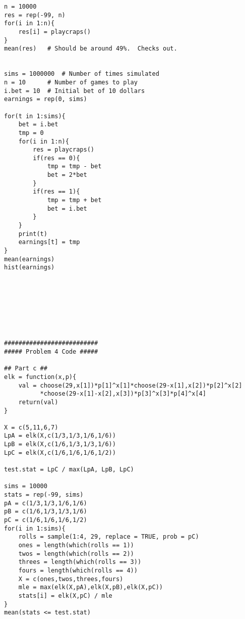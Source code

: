 \documentclass[11pt]{article}
\begin{document}
\begin{center}
\begin{lstlisting}
n = 10000
res = rep(-99, n)
for(i in 1:n){
	res[i] = playcraps()
}
mean(res)	# Should be around 49%.  Checks out.


sims = 1000000	# Number of times simulated
n = 10		# Number of games to play
i.bet = 10	# Initial bet of 10 dollars
earnings = rep(0, sims)

for(t in 1:sims){
	bet = i.bet
	tmp = 0
	for(i in 1:n){
		res = playcraps()
		if(res == 0){
			tmp = tmp - bet
			bet = 2*bet
		}
		if(res == 1){
			tmp = tmp + bet
			bet = i.bet
		}
	}
	print(t)
	earnings[t] = tmp
}
mean(earnings)
hist(earnings)








##########################
##### Problem 4 Code #####

## Part c ##
elk = function(x,p){
	val = choose(29,x[1])*p[1]^x[1]*choose(29-x[1],x[2])*p[2]^x[2]
	      *choose(29-x[1]-x[2],x[3])*p[3]^x[3]*p[4]^x[4]
	return(val)
}

X = c(5,11,6,7)
LpA = elk(X,c(1/3,1/3,1/6,1/6))
LpB = elk(X,c(1/6,1/3,1/3,1/6))
LpC = elk(X,c(1/6,1/6,1/6,1/2))

test.stat = LpC / max(LpA, LpB, LpC)

sims = 10000
stats = rep(-99, sims)
pA = c(1/3,1/3,1/6,1/6)
pB = c(1/6,1/3,1/3,1/6)
pC = c(1/6,1/6,1/6,1/2)
for(i in 1:sims){
	rolls = sample(1:4, 29, replace = TRUE, prob = pC)
	ones = length(which(rolls == 1))
	twos = length(which(rolls == 2))
	threes = length(which(rolls == 3))
	fours = length(which(rolls == 4))
	X = c(ones,twos,threes,fours)
	mle = max(elk(X,pA),elk(X,pB),elk(X,pC))
	stats[i] = elk(X,pC) / mle
}
mean(stats <= test.stat)



\end{lstlisting}
\end{center}
\end{document}
